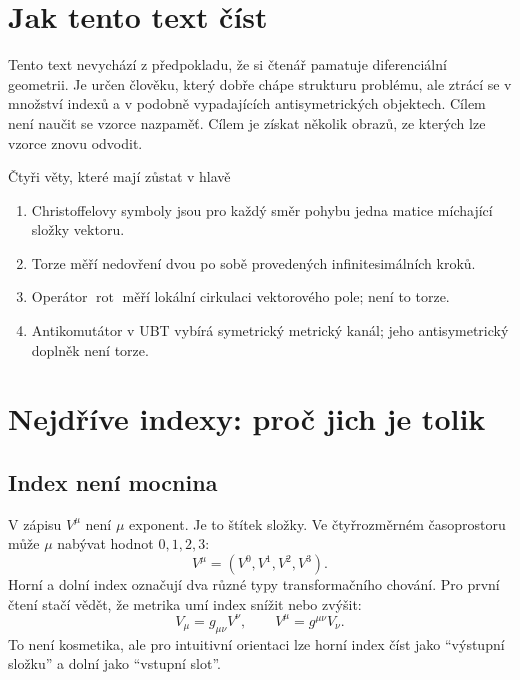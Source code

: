 
\section*{Jak tento text číst}
Tento text nevychází z předpokladu, že si čtenář pamatuje diferenciální geometrii.
Je určen člověku, který dobře chápe strukturu problému, ale ztrácí se v množství
indexů a v podobně vypadajících antisymetrických objektech. Cílem není naučit se
vzorce nazpaměť. Cílem je získat několik obrazů, ze kterých lze vzorce znovu
odvodit.

\begin{memorybox}{Čtyři věty, které mají zůstat v hlavě}
\begin{enumerate}[leftmargin=*,itemsep=0.25em]
  \item Christoffelovy symboly jsou pro každý směr pohybu jedna matice míchající složky vektoru.
  \item Torze měří nedovření dvou po sobě provedených infinitesimálních kroků.
  \item Operátor $\operatorname{rot}$ měří lokální cirkulaci vektorového pole; není to torze.
  \item Antikomutátor v UBT vybírá symetrický metrický kanál; jeho antisymetrický doplněk není torze.
\end{enumerate}
\end{memorybox}

\section{Nejdříve indexy: proč jich je tolik}

\subsection{Index není mocnina}
V zápisu $V^\mu$ není $\mu$ exponent. Je to štítek složky. Ve čtyřrozměrném
časoprostoru může $\mu$ nabývat hodnot $0,1,2,3$:
\[
  V^\mu=(V^0,V^1,V^2,V^3).
\]
Horní a dolní index označují dva různé typy transformačního chování. Pro první
čtení stačí vědět, že metrika umí index snížit nebo zvýšit:
\[
  V_\mu=g_{\mu\nu}V^\nu,
  \qquad
  V^\mu=g^{\mu\nu}V_\nu.
\]
To není kosmetika, ale pro intuitivní orientaci lze horní index číst jako
``výstupní složku'' a dolní jako ``vstupní slot''.

